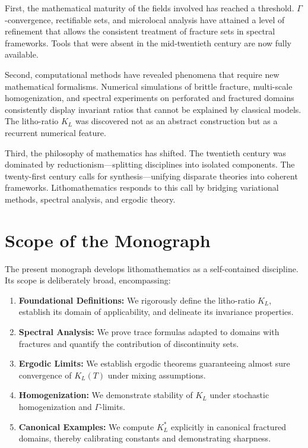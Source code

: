 First, the mathematical maturity of the fields involved has reached a
threshold. $\Gamma$-convergence, rectifiable sets, and microlocal analysis have
attained a level of refinement that allows the consistent treatment of fracture
sets in spectral frameworks. Tools that were absent in the mid-twentieth
century are now fully available.

Second, computational methods have revealed phenomena that require new
mathematical formalisms. Numerical simulations of brittle fracture,
multi-scale homogenization, and spectral experiments on perforated and fractured
domains consistently display invariant ratios that cannot be explained by
classical models. The litho-ratio $K_L$ was discovered not as an abstract
construction but as a recurrent numerical feature.

Third, the philosophy of mathematics has shifted. The twentieth century was
dominated by reductionism—splitting disciplines into isolated components. The
twenty-first century calls for synthesis—unifying disparate theories into
coherent frameworks. Lithomathematics responds to this call by bridging
variational methods, spectral analysis, and ergodic theory.

\bigskip

\section*{Scope of the Monograph}
The present monograph develops lithomathematics as a self-contained discipline.
Its scope is deliberately broad, encompassing:

\begin{enumerate}[label=(S\arabic*)]
  \item \textbf{Foundational Definitions:} We rigorously define the
  litho-ratio $K_L$, establish its domain of applicability, and delineate its
  invariance properties.
  \item \textbf{Spectral Analysis:} We prove trace formulas adapted to domains
  with fractures and quantify the contribution of discontinuity sets.
  \item \textbf{Ergodic Limits:} We establish ergodic theorems guaranteeing
  almost sure convergence of $K_L(T)$ under mixing assumptions.
  \item \textbf{Homogenization:} We demonstrate stability of $K_L$ under
  stochastic homogenization and $\Gamma$-limits.
  \item \textbf{Canonical Examples:} We compute $K_L^*$ explicitly in
  canonical fractured domains, thereby calibrating constants and demonstrating
  sharpness.
\end{enumerate}

